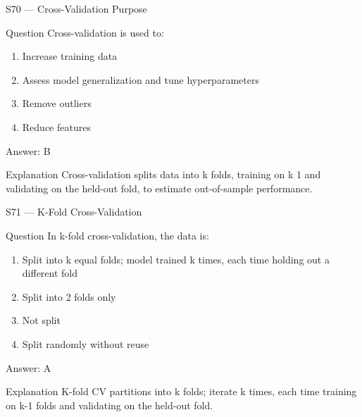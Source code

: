 \documentclass[aspectratio=169,8pt]{beamer}
\begin{document}
	\begin{frame}{S70 --- Cross-Validation Purpose}
		\begin{block}{Question}
			Cross-validation is used to:
			\begin{enumerate}
				\item Increase training data
				\item Assess model generalization and tune hyperparameters
				\item Remove outliers
				\item Reduce features
			\end{enumerate}
		\end{block}
		\begin{exampleblock}{Answer: B}\end{exampleblock}
		\begin{block}{Explanation}
			Cross-validation splits data into k folds, training on k 1 and validating on the held-out fold, to estimate out-of-sample performance.
		\end{block}
	\end{frame}
	
	\begin{frame}{S71 --- K-Fold Cross-Validation}
		\begin{block}{Question}
			In k-fold cross-validation, the data is:
			\begin{enumerate}
				\item Split into k equal folds; model trained k times, each time holding out a different fold
				\item Split into 2 folds only
				\item Not split
				\item Split randomly without reuse
			\end{enumerate}
		\end{block}
		\begin{exampleblock}{Answer: A}\end{exampleblock}
		\begin{block}{Explanation}
			K-fold CV partitions into k folds; iterate k times, each time training on k-1 folds and validating on the held-out fold.
		\end{block}
	\end{frame}
	
\end{document}
